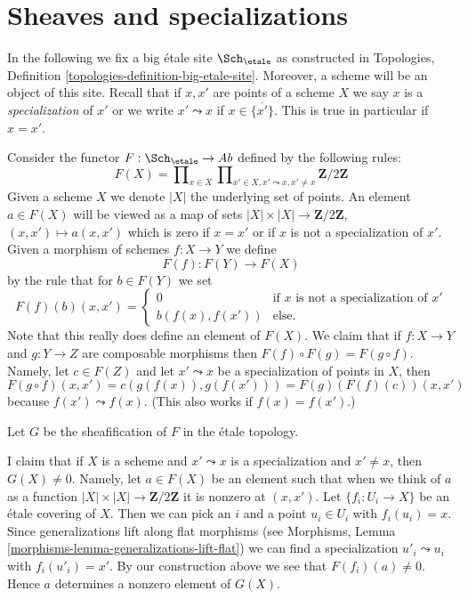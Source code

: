 \section{Sheaves and specializations}
\label{section-sheaves}

\noindent
In the following we fix a big \'etale site $\Sch_\etale$
as constructed in
Topologies, Definition \ref{topologies-definition-big-etale-site}.
Moreover, a scheme will be an object of this site.
Recall that if $x, x'$ are points of a scheme $X$ we say $x$ is a
{\it specialization} of $x'$ or we write $x' \leadsto x$ if
$x \in \overline{\{x'\}}$. This is true in particular if $x = x'$.

\medskip\noindent
Consider the functor $F : \Sch_\etale \to \textit{Ab}$
defined by the following rules:
$$
F(X) = \prod\nolimits_{x \in X}
\prod\nolimits_{x' \in X, x' \leadsto x, x' \not = x}
\mathbf{Z}/2\mathbf{Z}
$$
Given a scheme $X$ we denote $|X|$ the underlying set of points.
An element $a \in F(X)$ will be viewed as a map of sets
$|X| \times |X| \to \mathbf{Z}/2\mathbf{Z}$, $(x, x') \mapsto a(x, x')$
which is zero if $x = x'$ or if $x$ is not a specialization of $x'$.
Given a morphism of schemes $f : X \to Y$ we define
$$
F(f) : F(Y) \longrightarrow F(X)
$$
by the rule that for $b \in F(Y)$ we set
$$
F(f)(b)(x, x') =
\left\{
\begin{matrix}
0 & \text{if }x\text{ is not a specialization of }x' \\
b(f(x), f(x')) & \text{else.}
\end{matrix}
\right.
$$
Note that this really does define an element of $F(X)$. We claim that if
$f : X \to Y$ and $g : Y \to Z$ are composable morphisms then
$F(f) \circ F(g) = F(g \circ f)$. Namely, let $c \in F(Z)$ and let
$x' \leadsto x$ be a specialization of points in $X$, then
$$
F(g \circ f)(x, x') = c(g(f(x)), g(f(x'))) = F(g)(F(f)(c))(x, x')
$$
because $f(x') \leadsto f(x)$. (This also works if $f(x) = f(x')$.)

\medskip\noindent
Let $G$ be the sheafification of $F$ in the \'etale topology.

\medskip\noindent
I claim that if $X$ is a scheme and $x' \leadsto x$ is a specialization
and $x' \not = x$, then $G(X) \not = 0$. Namely, let $a \in F(X)$ be
an element such that when we think of $a$ as a function
$|X| \times |X| \to \mathbf{Z}/2\mathbf{Z}$ it is nonzero at $(x, x')$.
Let $\{f_i : U_i \to X\}$ be an \'etale covering of $X$. Then we can pick an
$i$ and a point $u_i \in U_i$ with $f_i(u_i) = x$. Since generalizations
lift along flat morphisms (see
Morphisms, Lemma \ref{morphisms-lemma-generalizations-lift-flat})
we can find a specialization $u'_i \leadsto u_i$
with $f_i(u'_i) = x'$. By our construction above we see that
$F(f_i)(a) \not = 0$. Hence $a$ determines a nonzero element of $G(X)$.

